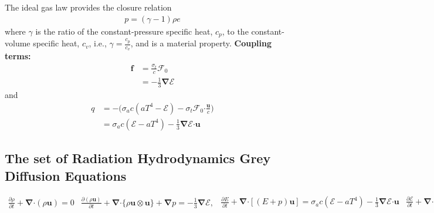 \documentclass[10pt,letterpaper,notitlepage]{article}
\numberwithin{equation}{section}
\newcommand{\partialderiv}[2]{\frac{\partial #1}{\partial #2}}
\newcommand{\bnabla}{\boldsymbol{\nabla}}
\newcommand{\velocity}{\mathbf{u}}
\newcommand{\dotp}{\boldsymbol{\cdot}}
\newcommand{\RadE}{\mathcal{E}}
\newcommand{\RadF}{\boldsymbol{\mathcal{F}}}
\newcommand{\beqn}{\begin{equation}\begin{aligned}}
\newcommand{\eeqn}{\end{aligned}\end{equation}}
\begin{document}
The ideal gas law provides the closure relation
\beqn 
p = (\gamma - 1) \rho e
\eeqn 
where $\gamma$ is the ratio of the constant-pressure specific heat, $c_p$, to the constant-volume specific heat, $c_v$, i.e., $\gamma = \frac{c_p}{c_v}$, and is a material property.
\newline
\newline
\textbf{Coupling terms:}\newline
\beqn 
\mathbf{f} &= \frac{\sigma_t}{c} \RadF_0 \\ &= -\frac{1}{3} \bnabla \RadE
\eeqn 
and
\beqn 
q &= - \biggr(\sigma_a c (a T^4 - \RadE) - \sigma_t \RadF_0 \dotp \frac{\mathbf{u}}{c} \biggr)\\
&= \sigma_a c (\RadE - a T^4) - \frac{1}{3} \bnabla \RadE \dotp \velocity
\eeqn 

\newpage
\subsection{The set of Radiation Hydrodynamics Grey Diffusion Equations}
\begin{subequations}
\beqn 
\partialderiv{\rho}{t} + \bnabla \dotp (\rho \velocity) = 0
\eeqn 
\beqn 
\partialderiv{(\rho\velocity)}{t} + \bnabla \dotp \{ \rho \velocity \otimes \velocity\}  + \bnabla p 
= -\frac{1}{3} \bnabla \RadE,
\eeqn 
\beqn 
\partialderiv{E}{t} + \bnabla \dotp [(E + p)\velocity] 
= \sigma_a c (\RadE - a T^4) - \frac{1}{3} \bnabla \RadE \dotp \velocity
\eeqn 
\beqn 
\frac{\partial \RadE}{\partial t} 
+\bnabla \dotp \biggr(  -\frac{c}{3\sigma_t} \bnabla \RadE \biggr) + \frac{4}{3} \bnabla \bigr( \RadE \mathbf{u}  \bigr)
&=  \sigma_a c \bigr( aT^4 - \RadE \bigr)
+\frac{1}{3} \bnabla \RadE  \dotp \velocity.
\eeqn
where
\beqn 
E = \frac{1}{2} \rho ||\velocity||^2 + \rho e,
\eeqn 
\beqn 
p = (\gamma - 1) \rho e,
\eeqn 
\beqn 
T = \frac{1}{C_v} e
\eeqn 
\beqn 
\sigma_t(T) &= \sigma_s(T) + \sigma_a(T)\\
\eeqn 
\beqn 
\sigma_s(T) &= \rho \kappa_s (T) \\
\eeqn 
\beqn 
\sigma_a(T) &= \rho \kappa_a (T)
\eeqn 
\end{subequations}
\end{document}

